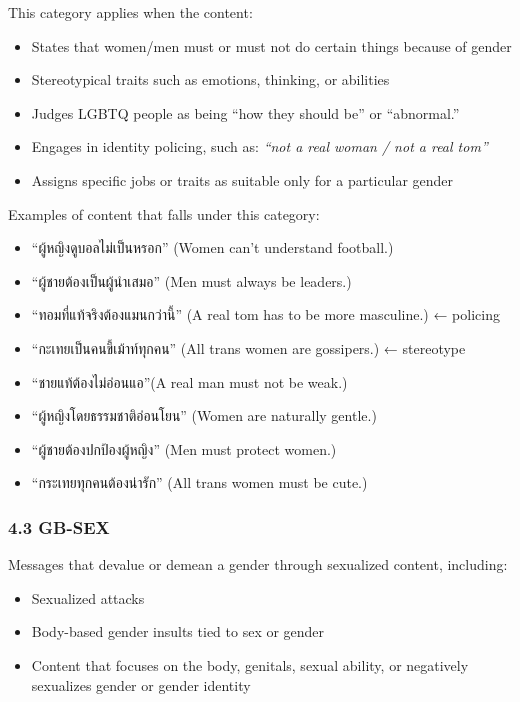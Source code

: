 \documentclass[12pt,oneside,openright,a4paper]{cpe-english-project}
\begin{document}
This category applies when the content:

\begin{itemize}
\setlength{\itemsep}{0.15\baselineskip}
\setlength{\parsep}{0pt}
\setlength{\parskip}{0pt}
\item
  States that women/men must or must not do certain things because of
  gender
\item
  Stereotypical traits such as emotions, thinking, or abilities
\item
  Judges LGBTQ people as being ``how they should be'' or ``abnormal.''
\item
  Engages in identity policing, such as: \emph{``not a real woman / not
  a real tom''}
\item
  Assigns specific jobs or traits as suitable only for a particular
  gender
\end{itemize}

Examples of content that falls under this category:

\begin{itemize}
\setlength{\itemsep}{0.15\baselineskip}
\setlength{\parsep}{0pt}
\setlength{\parskip}{0pt}
\item
  ``ผู้หญิงดูบอลไม่เป็นหรอก'' (Women can't understand football.)
\item
  ``ผู้ชายต้องเป็นผู้นำเสมอ'' (Men must always be leaders.)
\item
  ``ทอมที่แท้จริงต้องแมนกว่านี้'' (A real tom has to be more masculine.) ←
  policing
\item
  ``กะเทยเป็นคนขี้เม้าท์ทุกคน'' (All trans women are gossipers.) ←
  stereotype
\item
  ``ชายแท้ต้องไม่อ่อนแอ''(A real man must not be weak.)
\item
  ``ผู้หญิงโดยธรรมชาติอ่อนโยน'' (Women are naturally gentle.)
\item
  ``ผู้ชายต้องปกป้องผู้หญิง'' (Men must protect women.)
\item
  ``กระเทยทุกคนต้องน่ารัก'' (All trans women must be cute.)
\end{itemize}

\subsubsection{4.3 GB-SEX}\label{gb-sex}

Messages that devalue or demean a gender through sexualized content,
including:

\begin{itemize}
\setlength{\itemsep}{0.15\baselineskip}
\setlength{\parsep}{0pt}
\setlength{\parskip}{0pt}
\item
  Sexualized attacks
\item
  Body-based gender insults tied to sex or gender
\item
  Content that focuses on the body, genitals, sexual ability, or
  negatively sexualizes gender or gender identity
\end{itemize}
\end{document}
